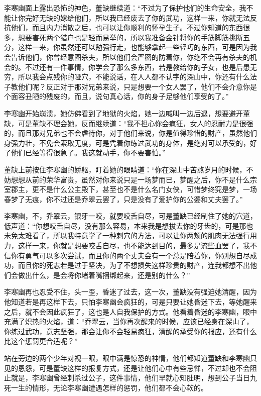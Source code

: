 李寒幽面上露出恐怖的神色，董缺继续道：“不过为了保护他们的生命安全，我不能让你完好无缺的嫁给他们，所以我已经废去了你的武功，这样一来，你就无法反抗他们，而且内力消散之后，也可以让你顺利的怀孕生子。不过你知道的东西很多，想要害死两个猎户也是轻而易举的，所以我准备金针将你的手筋脚筋挑断五分，这样一来，你虽然还可以勉强行走，也能够拿起一些轻巧的东西，可是因为我会告诉他们，你曾经意图杀夫，所以他们会严密的防着你，你绝不会再有杀夫的机会的。不过还有一件事情，你学会了那么多东西，若是教给你的子女，也是后患无穷，所以我会点残你的哑穴，不能说话，在人人都不认字的深山中，你还有什么法子教他们呢？反正对于那对兄弟来说，只是想要一个女人罢了，他们不会介意你是个面容丑陋的残废的，而且，说句真心话，你的身子足够他们享受的了。”

李寒幽开始崩溃，她仿佛看到了地狱的火焰，她一边喊叫一边后退，想要避开董缺，可是董缺不理会她，反而继续道：“我不担心你会疯狂，女人的忍耐力是很强的，而且那对兄弟也不会虐待你，对于他们来说，你是值得珍惜的财产，虽然他们身强力壮，不免会索取无度，可是凭着你练过武功的身体，是绝对可以承受的，好了他们已经等得很急了。我这就动手，你不要害怕。”

董缺上前按住李寒幽的娇躯，盯着她的眼睛道：“你在深山中苦熬岁月的时候，不妨想想从前的荣华富贵，虽然对你来说只是一场梦而已，梦醒之后，你不是什么宗室郡主，更不是什么公主殿下，甚至也不是什么名门女侠，可惜梦终究是梦，一场春梦了无痕，你不过还是乔翠云罢了，只是没有了爱护你的公婆和丈夫罢了。”

李寒幽，不，乔翠云，银牙一咬，就要咬舌自尽，可是董缺已经制住了她的穴道，低声道：“你想咬舌自尽，没有那么容易，本来我是想拔去你的牙齿的，可是那也未免太难看了，所以我特意学了一种刺穴的方法，可以让你两颊的肌肉无法强行用力，这样一来，你就是想要咬舌自尽，也不能达到目的，最多是流些血罢了，我不信你有勇气可以多次尝试，而且你的两个丈夫会有一个总是陪着你，你别想自尽成功，而且你的死志若是过于坚决，为了不想损失这样珍贵的财产，连我都想不出他们会做出什么，是会将你堵着嘴捆绑起来，还是别的什么？”

李寒幽再也忍受不住，头一歪，昏迷了过去，这一次，董缺没有强迫她清醒，因为他知道若是再这样下去，只怕李寒幽会疯狂的，可是只要让她昏迷下去，等她醒来之后，就不会因此疯狂了，这也是人自我保护的方式。他看着昏迷的李寒幽，眼中充满了炽热的火焰，道：“乔翠云，当你再次醒来的时候，应该已经身在深山了，你练过武功，意志坚强，那会让你不会轻易疯狂，清醒的承受你的报应，还有什么比这个惩罚更合适呢？”

站在旁边的两个少年对视一眼，眼中满是惊恐的神情，他们都知道董缺和李寒幽只见的恩怨，可是董缺这样的报复方式，还是让他们心中有些忌惮，不过却也不会阻止就是，李寒幽曾经刺杀过公子，这件事情，他们早就心知肚明，想到公子当日九死一生的情形，无论李寒幽遭遇怎样的惩罚，他们都不会心软的。

